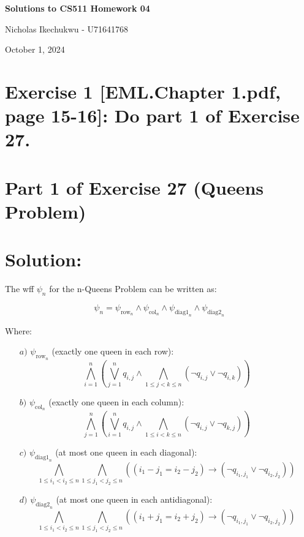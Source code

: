 \documentclass{article}
\begin{document}
\begin{center}
    \Large\textbf{Solutions to CS511 Homework 04}
    
    \vspace{0.5cm}
    
    \large Nicholas Ikechukwu - U71641768
    
    \vspace{0.3cm}
    
    \large October 1, 2024
\end{center}



\section*{Exercise 1 [EML.Chapter 1.pdf, page 15-16]: Do part 1 of Exercise 27.}

\section*{Part 1 of Exercise 27 (Queens Problem)}
\section*{Solution:}

The wff $\psi_n$ for the n-Queens Problem can be written as:

\[ \psi_n = \psi_{\text{row}_n} \wedge \psi_{\text{col}_n} \wedge \psi_{\text{diag1}_n} \wedge \psi_{\text{diag2}_n} \]

Where:

\begin{enumerate}
    \item[$a)$] $\psi_{\text{row}_n}$ (exactly one queen in each row):
    \[ \bigwedge_{i=1}^n \left(\bigvee_{j=1}^n q_{i,j} \wedge \bigwedge_{1 \leq j < k \leq n} (\neg q_{i,j} \vee \neg q_{i,k})\right) \]

    \item[$b)$] $\psi_{\text{col}_n}$ (exactly one queen in each column):
    \[ \bigwedge_{j=1}^n \left(\bigvee_{i=1}^n q_{i,j} \wedge \bigwedge_{1 \leq i < k \leq n} (\neg q_{i,j} \vee \neg q_{k,j})\right) \]

    \item[$c)$] $\psi_{\text{diag1}_n}$ (at most one queen in each diagonal):
    \[ \bigwedge_{1 \leq i_1 < i_2 \leq n} \bigwedge_{1 \leq j_1 < j_2 \leq n} ((i_1 - j_1 = i_2 - j_2) \rightarrow (\neg q_{i_1,j_1} \vee \neg q_{i_2,j_2})) \]

    \item[$d)$] $\psi_{\text{diag2}_n}$ (at most one queen in each antidiagonal):
    \[ \bigwedge_{1 \leq i_1 < i_2 \leq n} \bigwedge_{1 \leq j_1 < j_2 \leq n} ((i_1 + j_1 = i_2 + j_2) \rightarrow (\neg q_{i_1,j_1} \vee \neg q_{i_2,j_2})) \]
\end{enumerate}
\end{document}
